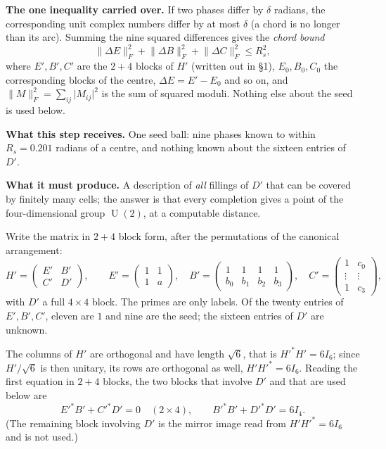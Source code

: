 \documentclass[11pt]{article}
\newcommand{\abs}[1]{\lvert #1\rvert}
\newcommand{\norm}[1]{\lVert #1\rVert}
\DeclareMathOperator{\U}{U}
\newcommand{\key}[1]{\par\Needspace{5\baselineskip}\medskip\noindent{\normalsize\bfseries #1}\par\nobreak\vspace{-1pt}}
\begin{document}
\begin{recap}
\textbf{The one inequality carried over.} If two phases differ by $\delta$ radians, the corresponding
unit complex numbers differ by at most $\delta$ (a chord is no longer than its arc). Summing the nine
squared differences gives the \emph{chord bound}
\begin{equation}\label{eq:chord}
\norm{\Delta E}_F^2+\norm{\Delta B}_F^2+\norm{\Delta C}_F^2\le R_s^2,
\end{equation}
where $E',B',C'$ are the $2+4$ blocks of $H'$ (written out in \S1), $E_0,B_0,C_0$ the corresponding
blocks of the centre, $\Delta E=E'-E_0$ and so on, and
$\norm{M}_F^2=\sum_{ij}\abs{M_{ij}}^2$ is the sum of squared moduli. Nothing else about the seed is
used below.
\end{recap}

\par\medskip\noindent\textbf{What this step receives.} One seed ball: nine phases known to within
$R_s=0.201$ radians of a centre, and nothing known about the sixteen entries of $D'$.

\par\smallskip\noindent\textbf{What it must produce.} A description of \emph{all} fillings of $D'$ that
can be covered by finitely many cells; the answer is that every completion gives a point of the
four-dimensional group $\U(2)$, at a computable distance.

\key{1.\ Where the unknown entries sit}

Write the matrix in $2+4$ block form, after the permutations of the canonical arrangement:
\[
H'=\begin{pmatrix}E'&B'\\ C'&D'\end{pmatrix},\qquad
E'=\begin{pmatrix}1&1\\ 1&a\end{pmatrix},\quad
B'=\begin{pmatrix}1&1&1&1\\[2pt] b_0&b_1&b_2&b_3\end{pmatrix},\quad
C'=\begin{pmatrix}1&c_0\\ \vdots&\vdots\\ 1&c_3\end{pmatrix},
\]
with $D'$ a full $4\times4$ block. The primes are only labels. Of the twenty entries of $E',B',C'$,
eleven are $1$ and nine are the seed; the sixteen entries of $D'$ are unknown.

The columns of $H'$ are orthogonal and have length $\sqrt6$, that is $H'^*H'=6I_6$; since
$H'/\sqrt6$ is then unitary, its rows are orthogonal as well, $H'H'^*=6I_6$. Reading the first
equation in $2+4$ blocks, the two blocks that involve $D'$ and that are used below are
\begin{equation}\label{eq:blocks}
E'^*B'+C'^*D'=0\quad(2\times4),\qquad B'^*B'+D'^*D'=6I_4 .
\end{equation}
(The remaining block involving $D'$ is the mirror image read from $H'H'^*=6I_6$ and is not used.)
\end{document}
